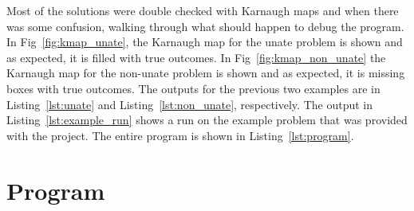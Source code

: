 \documentclass[journal,onecolumn,12pt]{IEEEtran}
\begin{document}
Most of the solutions were double checked with Karnaugh maps and when there was some confusion,
walking through what should happen to debug the
program. In Fig~\ref{fig:kmap_unate}, the Karnaugh map for the unate
problem is shown and as expected, it is filled with true
outcomes. In Fig~\ref{fig:kmap_non_unate} the Karnaugh map for the
non-unate problem is shown and as expected, it is missing boxes with
true outcomes. The outputs for the previous two examples are in
Listing~\ref{lst:unate} and Listing~\ref{lst:non_unate}, respectively.
The output in Listing~\ref{lst:example_run} shows a run on the
example problem that was provided with the project. The entire program
is shown in Listing~\ref{lst:program}.





\section{Program}

\end{document}
